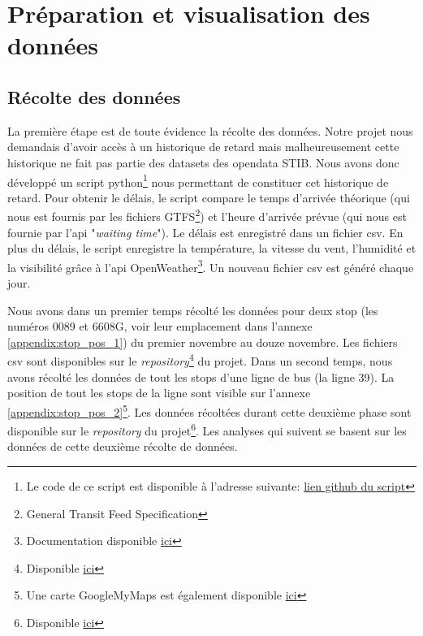 \chapter{Préparation et visualisation des données}

\section{Récolte des données}
La première étape est de toute évidence la récolte des données. Notre projet nous demandais d'avoir accès à un historique de retard mais malheureusement cette historique ne fait pas partie des datasets des opendata STIB. Nous avons donc développé un script python\footnote{Le code de ce script est disponible à l'adresse suivante: \href{https://github.com/jalbrecq/CanYouCatchIt/blob/main/sandbox/delay_gathering/delay_gathering.py}{lien github du script}} nous permettant de constituer cet historique de retard. Pour obtenir le délais, le script compare le temps d'arrivée théorique (qui nous est fournis par les fichiers GTFS\footnote{General Transit Feed Specification}) et l'heure d'arrivée prévue (qui nous est fournie par l'api "\textit{waiting time}"). Le délais est enregistré dans un fichier csv. En plus du délais, le script enregistre la température, la vitesse du vent, l'humidité et la visibilité grâce à l'api OpenWeather\footnote{Documentation disponible \href{https://openweathermap.org/}{ici}}. Un nouveau fichier csv est généré chaque jour.

Nous avons dans un premier temps récolté les données pour deux stop (les numéros 0089 et 6608G, voir leur emplacement dans l'annexe \ref{appendix:stop_pos_1}) du premier novembre au douze novembre. Les fichiers csv sont disponibles sur le \textit{repository}\footnote{Disponible \href{https://github.com/jalbrecq/CanYouCatchIt/tree/main/sandbox/data/csv}{ici}} du projet. Dans un second temps, nous avons récolté les données de tout les stops d'une ligne de bus (la ligne 39). La position de tout les stops de la ligne sont visible sur l'annexe \ref{appendix:stop_pos_2}\footnote{Une carte GoogleMyMaps est également disponible \href{https://www.google.com/maps/d/edit?mid=1_qNGPUfuZXrqC3UZXkmDOWuhEHJfYAox&usp=sharing}{ici}}. Les données récoltées durant cette deuxième phase sont disponible sur le \textit{repository} du projet\footnote{Disponible \href{https://github.com/jalbrecq/CanYouCatchIt/tree/main/sandbox/data/csv2}{ici}}. Les analyses qui suivent se basent sur les données de cette deuxième récolte de données.

